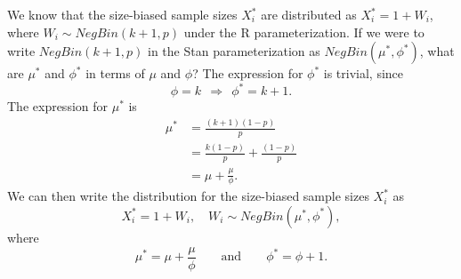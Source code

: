\documentclass[10pt,a4paper]{article}
\begin{document}
We know that the size-biased sample sizes $X_i^*$ are distributed as $X_i^* = 1 + W_i$, where $W_i \sim NegBin(k+1, p)$ under the R parameterization. If we were to write $NegBin(k+1, p)$ in the Stan parameterization as $NegBin(\mu^*, \phi^*)$, what are $\mu^*$ and $\phi^*$ in terms of $\mu$ and $\phi$? The expression for $\phi^*$ is trivial, since
\[
	\phi = k ~~\Longrightarrow~~ \phi^* = k + 1.
\]
The expression for $\mu^*$ is
\begin{align*}
	\mu^* &= \frac{(k+1) (1-p)}{p} \\[3pt]
	&= \frac{k(1-p)}{p} + \frac{(1-p)}{p} \\[3pt]
	&= \mu + \frac{\mu}{\phi}.
\end{align*}
We can then write the distribution for the size-biased sample sizes $X_i^*$ as
\[
	X_i^* = 1 + W_i, \quad W_i \sim NegBin(\mu^*, \phi^*),
\]
where
\[
 \mu^* = \mu + \frac{\mu}{\phi} \quad\quad \text{and} \quad\quad \phi^* = \phi + 1.
\]
\end{document}

